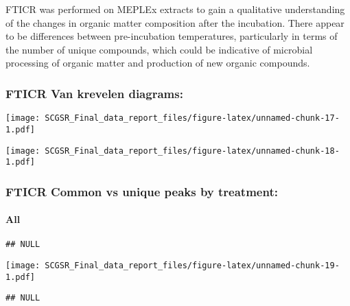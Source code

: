 \documentclass[
]{article}
\begin{document}
FTICR was performed on MEPLEx extracts to gain a qualitative
understanding of the changes in organic matter composition after the
incubation. There appear to be differences between pre-incubation
temperatures, particularly in terms of the number of unique compounds,
which could be indicative of microbial processing of organic matter and
production of new organic compounds.

\hypertarget{fticr-van-krevelen-diagrams}{%
\subsubsection{FTICR Van krevelen
diagrams:}\label{fticr-van-krevelen-diagrams}}

\texttt{[image: SCGSR\_Final\_data\_report\_files/figure-latex/unnamed-chunk-17-1.pdf]}

\texttt{[image: SCGSR\_Final\_data\_report\_files/figure-latex/unnamed-chunk-18-1.pdf]}

\hypertarget{fticr-common-vs-unique-peaks-by-treatment}{%
\subsubsection{FTICR Common vs unique peaks by
treatment:}\label{fticr-common-vs-unique-peaks-by-treatment}}

\hypertarget{all}{%
\paragraph{All}\label{all}}

\begin{verbatim}
## NULL
\end{verbatim}

\texttt{[image: SCGSR\_Final\_data\_report\_files/figure-latex/unnamed-chunk-19-1.pdf]}

\begin{verbatim}
## NULL
\end{verbatim}
\end{document}
